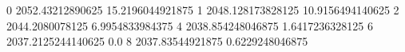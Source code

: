 0 2052.43212890625 15.2196044921875
1 2048.128173828125 10.9156494140625
2 2044.2080078125 6.9954833984375
4 2038.854248046875 1.6417236328125
6 2037.2125244140625 0.0
8 2037.83544921875 0.6229248046875
